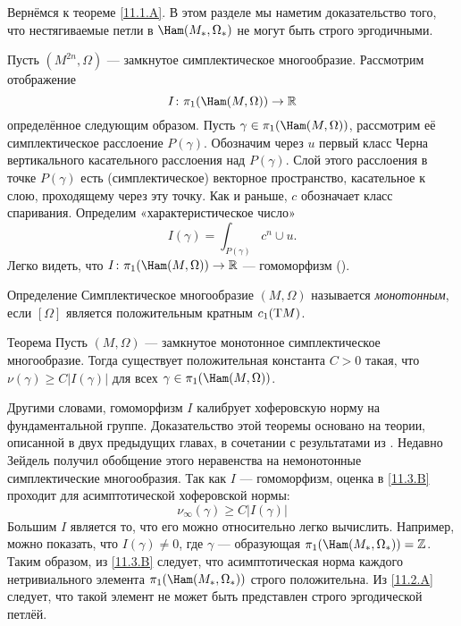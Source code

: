 Вернёмся к теореме \ref{11.1.A}.
В этом разделе мы наметим доказательство того, что нестягиваемые петли в $\Ham(M_\ast, \Omega_\ast)$ не могут быть строго эргодичными.

Пусть $(M^{2n},\Omega)$ --- замкнутое симплектическое многообразие.
Рассмотрим отображение
\[I\:\pi_1(\Ham(M,\Omega))\to\RR\]
определённое следующим образом.
Пусть $\gamma\in\pi_1(\Ham(M,\Omega))$,
рассмотрим её симплектическое расслоение $P(\gamma)$.
Обозначим через $u$ первый класс Черна вертикального касательного расслоения над $P(\gamma)$.
Слой этого расслоения в точке $P(\gamma)$ есть (симплектическое) векторное пространство, касательное к слою, проходящему через эту точку.
Как и раньше, $c$ обозначает класс спаривания.
Определим «характеристическое число» 
\[I(\gamma)= \int_{P(\gamma)} c^n\cup u.\]
Легко видеть, что $I\: \pi_1(\Ham(M, \Omega))\to \RR$ --- гомоморфизм (\cite{P6,LMP2}).

\begin{ex}{Определение}\label{11.3.A} Симплектическое многообразие $(M,\Omega)$ называется \emph{монотонным}, если $[\Omega]$ является положительным кратным $c_1 (\mathrm{T} M)$.
\end{ex}

\begin{thm}[(\cite{P6})]{Теорема}\label{11.3.B}
Пусть $(M, \Omega)$ --- замкнутое монотонное симплектическое многообразие.
Тогда существует положительная константа $C>0$ такая, что
$\nu(\gamma)\ge C|I(\gamma)|$ для всех $\gamma\z\in\pi_1(\Ham(M,\Omega))$.
\end{thm}

Другими словами, гомоморфизм $I$ калибрует хоферовскую норму на фундаментальной группе.
Доказательство этой теоремы основано на теории, описанной в двух предыдущих главах, в сочетании с результатами из \cite{Se}.
Недавно Зейдель получил обобщение этого неравенства на немонотонные симплектические многообразия.
Так как $I$ --- гомоморфизм, оценка в \ref{11.3.B} проходит для асимптотической хоферовской нормы: 
\[\nu_\infty(\gamma)\ge C|I(\gamma)|\]
Большим  $I$ является то, что его можно относительно легко вычислить.
Например, можно показать, что $I(\gamma) \ne 0$, где $\gamma$ --- образующая $\pi_1(\Ham(M_\ast,\Omega_\ast)) = \ZZ$.
Таким образом, из \ref{11.3.B} следует, что асимптотическая норма каждого нетривиального элемента $\pi_1(\Ham(M_\ast, \Omega_\ast))$ строго положительна.
Из \ref{11.2.A} следует, что такой элемент не может быть представлен строго эргодической петлёй.
